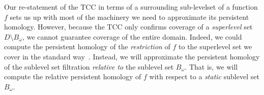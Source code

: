 
Our re-statement of the TCC in terms of a surrounding sub-levelset of a function $f$ sets us up with most of the machinery we need to approximate its persistent homology.
However, because the TCC only confirms coverage of a \emph{superlevel} set $D\setminus B_\omega$, we cannot guarantee coverage of the entire domain.
Indeed, we could compute the persistent homology of the \emph{restriction} of $f$ to the superlevel set we cover in the standard way~\cite{chazal09analysis}.%
Instead, we will approximate the persistent homology of the sublevel set filtration \emph{relative to} the sublevel set $B_\omega$.
That is, we will compute the relative persistent homology of $f$ with respect to a \emph{static} sublevel set $B_\omega$.


